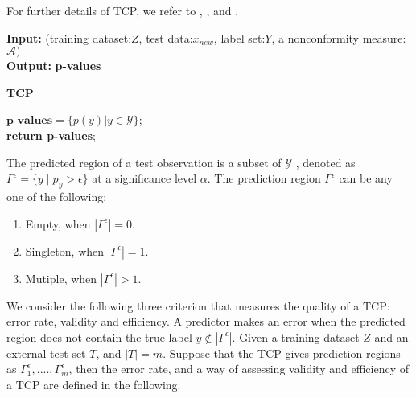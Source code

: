 \documentclass[main]{subfiles}
\begin{document}
For further details of TCP, we refer to \cite{vapnik1998statistical}, \cite{shafer2008tutorial}, \cite{vovk2005algorithmic} and \cite{balasubramanian2014conformal}.

\begin{algorithm}[h]
 \textbf{Input:}{ (training dataset:$Z$, test data:$x_{new}$, label set:$Y$, a nonconformity measure:$\mathcal{A})$}\\
 \textbf{Output:}{\textbf{ p-values} }\\
 \caption{\textbf{TCP}}
 $\textbf{p-values} = \{ p(y)| y \in \mathcal{Y}\}$;\\
 \textbf{return \textbf{p-values}};\\
 \end{algorithm}
 

The predicted region of a test observation is a subset of $\mathcal{Y}$ , denoted as $\Gamma^{\epsilon} = \{ y \mid p_y > \epsilon \}$ at a significance level $\alpha$. The prediction region $\Gamma^{\epsilon}$ can be any one of the following:
\begin{enumerate}
\item Empty, when $|\Gamma^{\epsilon}| = 0$.
\item Singleton, when $|\Gamma^{\epsilon}| = 1$.
\item Mutiple, when $|\Gamma^{\epsilon}| >1$.
\end{enumerate}
 
We consider the following three criterion that measures the quality of a TCP: error rate,
validity and efficiency. A predictor makes an error when the predicted region does not contain the true label $ y \not\in |\Gamma^{\epsilon}|$. Given a training dataset $Z$ and an external test set $T$,  and $|T| = m$. Suppose that the TCP gives prediction regions as $\Gamma_1^{\epsilon}, ...., \Gamma_m^{\epsilon}$, then the error rate, and a way of assessing validity and efficiency of a TCP are defined in the following.
\end{document}
